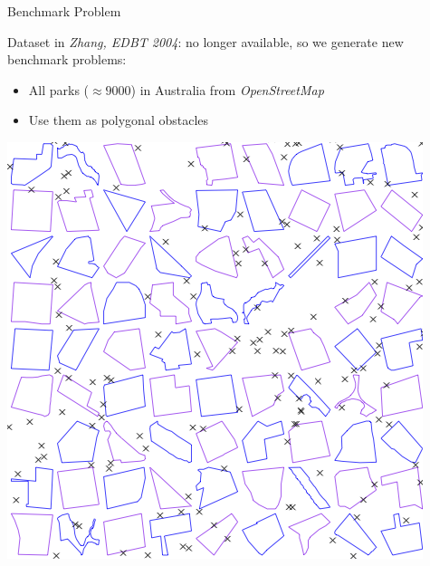 \begin{frame}{Benchmark Problem}
\begin{minipage}{.4\textwidth}
\small{Dataset in \textit{Zhang, EDBT 2004}: no longer available,
 so we generate new benchmark problems:}
\begin{itemize}
     \item \small{All parks ($\approx 9000$) in Australia from \textit{OpenStreetMap}}
     \item \small{Use them as polygonal obstacles}
\end{itemize}
\end{minipage}%
\begin{minipage}{.6\textwidth}
    \begin{adjustbox}{max totalsize={.9\textwidth}{.9\textheight}, right}
    \includegraphics{pic/distribution.png}
    \end{adjustbox}
\end{minipage}
\end{frame}

